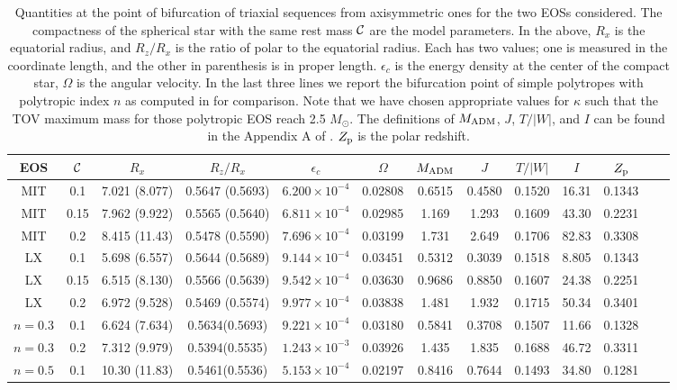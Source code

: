 \documentclass[twocolumn,superscriptaddress,showpacs,prd,aps,amsmath,amssymb,nofootinbib]{revtex4-1}
\begin{document}
\begin{table*}
\begin{tabular}{ccccccccccccc}
\hline
EOS&$\mathcal{C}$&$R_x$&$R_z/R_x$&$\epsilon_c$&$\Omega$&$M_{\rm ADM}$&$J$&$T/|W|$&$I$&$Z_{\rm p}$ \\
\hline
MIT& 0.1& 7.021 (8.077) & 	0.5647	(0.5693) & 	$ 6.200 \times 10^{-4} $	 & 	0.02808 & 	0.6515 & 	0.4580 & 	0.1520  & 	16.31  & 	0.1343 & 	 \\
MIT& 0.15& 7.962 (9.922) & 	0.5565 	(0.5640) & 	$ 6.811 \times 10^{-4} $ & 	0.02985 & 	1.169	 & 	1.293	 & 	0.1609	 & 	43.30	 & 	0.2231	  & \\
MIT& 0.2& 8.415 (11.43)	 & 	0.5478 	(0.5590)& 	$ 7.696	\times 10^{-4} $ & 	0.03199 & 	1.731 & 	2.649	 & 	0.1706 & 	82.83	 & 	0.3308	 & \\
LX& 0.1& 5.698	(6.557)	& 0.5644 (0.5689) & $9.144 \times 10^{-4} $	 & 	0.03451	 & 	0.5312 & 	0.3039 & 	0.1518	 & 	8.805	 & 	0.1343	 & 	 \\
LX& 0.15& 6.515 (8.130)& 0.5566 (0.5639)& 	$9.542 \times 10^{-4} $	 & 	0.03630 & 	0.9686& 	0.8850	 & 	0.1607	 & 	24.38	 & 	0.2251 & 	 	 \\
LX& 0.2& 6.972 (9.528)& 0.5469 (0.5574) & 	$9.977 \times 10^{-4} $	 & 	0.03838& 1.481& 	1.932  & 	0.1715 & 	50.34	 & 	0.3401	 & 	\\
\hline
$n=0.3$ & 0.1 & 6.624 (7.634) & 0.5634(0.5693) & $9.221 \times 10^{-4}$ & 0.03180 & 0.5841 & 0.3708 & 0.1507 & 11.66 & 0.1328 \\  
$n=0.3$ & 0.2 & 7.312 (9.979) & 0.5394(0.5535) & $1.243 \times 10^{-3}$ & 0.03926 & 1.435 & 1.835 & 0.1688 & 46.72 & 0.3311 \\  
$n=0.5$ & 0.1 & 10.30 (11.83) & 0.5461(0.5536) & $5.153 \times 10^{-4}$ & 0.02197 & 0.8416 & 0.7644 & 0.1493 & 34.80 & 0.1281 \\  
\hline
\end{tabular}
\caption{Quantities at the point of bifurcation of triaxial sequences
  from axisymmetric ones for the two EOSs considered. The compactness of
  the spherical star with the same rest mass $\mathcal{C}$ are the model
  parameters. In the above, $R_x$ is the equatorial radius, and $R_z/R_x$
  is the ratio of polar to the equatorial radius. Each has two values;
  one is measured in the coordinate length, and the other in parenthesis
  is in proper length. $\epsilon_c$ is the energy density at the center
  of the compact star, $\Omega$ is the angular velocity. In the last
  three lines we report the bifurcation point of simple polytropes with
  polytropic index $n$ as computed in \cite{Huang08} for comparison.
  Note that we have chosen appropriate values for $\kappa$ such that the
  TOV maximum mass for those polytropic EOS reach 2.5 $M_\odot$.
  The definitions of $M_{\rm ADM}$, $J$, $T/|W|$, and $I$ can be found
    in the Appendix A of \cite{Tsokaros2015}. $Z_{\rm p}$ is the polar
  redshift.}
\label{tab:secular}
\end{table*}
\end{document}
